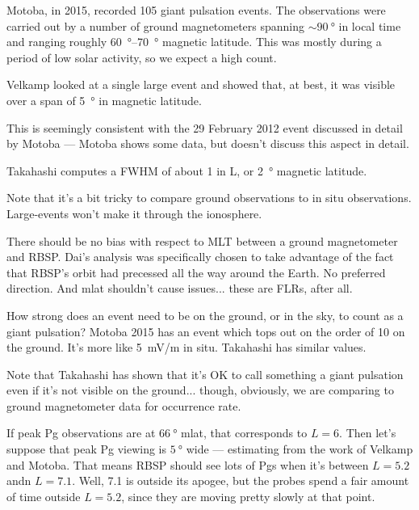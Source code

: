 Motoba, in 2015, recorded 105 giant pulsation events. The observations were carried out by a number of ground magnetometers spanning $\sim \SI{90}{\degree}$ in local time and ranging roughly \SIrange{60}{70}{\degree} magnetic latitude\cite{motoba_2015}. This was mostly during a period of low solar activity, so we expect a high count. 


Velkamp\cite{veldkamp_1960} looked at a single large event and showed that, at best, it was visible over a span of \SI{5}{\degree} in magnetic latitude. 

This is seemingly consistent with the 29 February 2012 event discussed in detail by Motoba\cite{motoba_2015} --- Motoba shows some data, but doesn't discuss this aspect in detail. 

Takahashi\cite{takahashi_2011} computes a FWHM of about 1 in L, or \SI{2}{\degree} magnetic latitude. 


Note that it's a bit tricky to compare ground observations to in situ observations. Large-\azm events won't make it through the ionosphere. 

There should be no bias with respect to MLT between a ground magnetometer and RBSP. Dai's analysis was specifically chosen to take advantage of the fact that RBSP's orbit had precessed all the way around the Earth. No preferred direction. And mlat shouldn't cause issues... these are FLRs, after all. 

How strong does an event need to be on the ground, or in the sky, to count as a giant pulsation? Motoba 2015\cite{motoba_2015} has an event which tops out on the order of \SI{10}{\nT} on the ground. It's more like \SI{5}{\mV/\m} in situ. Takahashi\cite{takahashi_2011} has similar values. 

Note that Takahashi\cite{takahashi_2013} has shown that it's OK to call something a giant pulsation even if it's not visible on the ground... though, obviously, we are comparing to ground magnetometer data for occurrence rate. 

If peak Pg observations are at $\SI{66}{\degree}$ mlat, that corresponds to $L = 6$. Then let's suppose that peak Pg viewing is $\SI{5}{\degree}$ wide --- estimating from the work of Velkamp and Motoba. That means RBSP should see lots of Pgs when it's between $L = 5.2$ andn $L = 7.1$. Well, \SI{7.1}{\RE} is outside its apogee, but the probes spend a fair amount of time outside $L = 5.2$, since they are moving pretty slowly at that point. 

